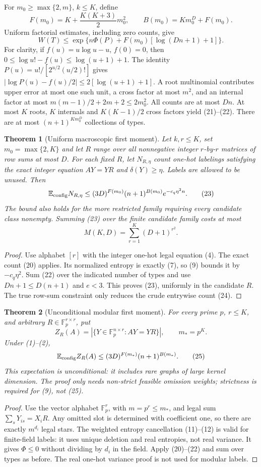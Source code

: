 \documentclass[11pt]{article}
\newtheorem{theorem}{Theorem}
\newcommand{\E}{\mathbb E}
\newcommand{\F}{\mathbb F}
\begin{document}
For $m_0\geq\max\{2,m\}$, $k\leq K$, define
\[
 F(m_0)=K+\frac{K(K+3)}2m_0^2,
 \qquad B(m_0)=Km_0^D+F(m_0).                     \tag{21}
\]
Uniform factorial estimates, including zero counts, give
\[
 W(T)\leq\exp\{n\Phi(P)+F(m_0)[\log(Dn+1)+1]\}.   \tag{22}
\]
For clarity, if $f(u)=u\log u-u$, $f(0)=0$, then
$0\leq\log u!-f(u)\leq\log(u+1)+1$.
The identity $P(u)=u!/[2^{u/2}(u/2)!]$ gives
$|\log P(u)-f(u)/2|\leq2[\log(u+1)+1]$.
A root multinomial contributes upper error at most one such unit,
a cross factor at most $m^2$, and an internal factor at most
$m(m-1)/2+2m+2\leq2m_0^2$. All counts are at most $Dn$.
At most $K$ roots, $K$ internals and $K(K-1)/2$ cross factors yield
(21)--(22). There are at most $(n+1)^{Km_0^D}$ collections of types.

\begin{theorem}[Uniform macroscopic first moment]\label{thm:macro}
Let $k,r\leq K$, set $m_0=\max\{2,K\}$ and let $R$ range over all
nonnegative integer $r$-by-$r$ matrices of row sums at most $D$.
For each fixed $R$, let $N_{R,\eta}$ count one-hot labelings satisfying
the exact integer equation $AY=YR$ and $\delta(Y)\geq\eta$.
Labels are allowed to be unused. Then
\[
 \E_{\rm config}N_{R,\eta}
 \leq(3D)^{F(m_0)}(n+1)^{B(m_0)}e^{-c_q\eta^2n}.   \tag{23}
\]
The bound also holds for the more restricted family requiring every
candidate class nonempty. Summing (23) over the finite candidate family
costs at most
\[
 M(K,D)=\sum_{r=1}^K(D+1)^{r^2}.                   \tag{24}
\]
\end{theorem}
\begin{proof}
Use alphabet $[r]$ with the integer one-hot legal equation (4).
The exact count (20) applies. Its normalized entropy is exactly (7),
so (9) bounds it by $-c_q\eta^2$. Sum (22) over the indicated number
of types and use $Dn+1\leq D(n+1)$ and $e<3$. This proves (23),
uniformly in the candidate $R$. The true row-sum constraint only
reduces the crude entrywise count (24).
\end{proof}

\begin{theorem}[Unconditional modular first moment]\label{thm:modular}
For every prime $p$, $r\leq K$, and arbitrary
$R\in\F_p^{r\times r}$, put
\[
 Z_R(A)=|\{Y\in\F_p^{n\times r}:AY=YR\}|,
 \qquad m_*=p^K.
\]
Under (1)--(2),
\[
 \E_{\rm config}Z_R(A)
 \leq(3D)^{F(m_*)}(n+1)^{B(m_*)}.                 \tag{25}
\]
This expectation is unconditional: it includes rare graphs of large
kernel dimension. The proof only needs non-strict feasible omission
weights; strictness is required for (9), not (25).
\end{theorem}
\begin{proof}
Use the vector alphabet $\F_p^r$, with $m=p^r\leq m_*$, and legal
sum $\sum_sY_{is}=X_iR$. Any omitted slot is determined with
coefficient one, so there are exactly $m^{d_i}$ legal stars.
The weighted entropy cancellation (11)--(12) is valid for finite-field
labels: it uses unique deletion and real entropies, not real variance.
It gives $\Phi\leq0$ without dividing by $d_i$ in the field.
Apply (20)--(22) and sum over types as before. The real one-hot
variance proof is not used for modular labels.
\end{proof}
\end{document}
